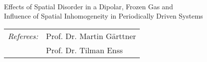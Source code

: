 \begin{titlepage}
    \begin{center}
        \large

        \hfill

        \vfill

        \begingroup
            \color{CTtitle} \\ \bigskip\bigskip
        Effects of Spatial Disorder in a Dipolar, Frozen Gas and\\
        Influence of Spatial Inhomogeneity in Periodically Driven Systems
        \endgroup

        \vfill

    \end{center}
    \vfill
    \begin{center}
        \begin{tabular}{ll}
             \textit{Referees:}\hspace{0.5cm} & Prof. Dr. Martin Gärttner\\
             & Prof. Dr. Tilman Enss
        \end{tabular}
    \end{center}
\end{titlepage}
